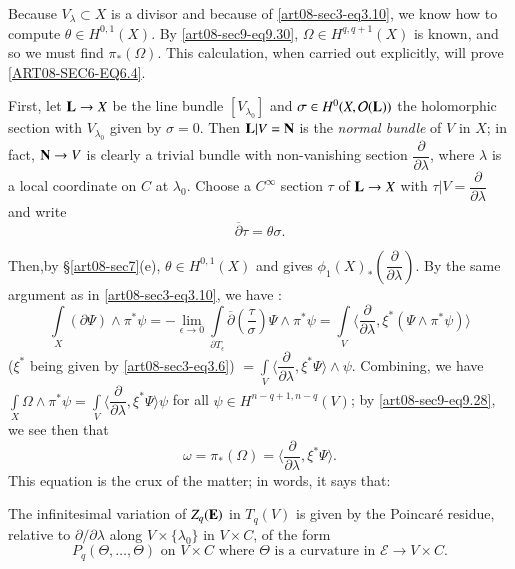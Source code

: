 Because $V_{\lambda}\subset X$ is a divisor and because of \eqref{art08-sec3-eq3.10}, we know how to compute $\theta\in H^{0,1}(X)$. By \eqref{art08-sec9-eq9.30}, $\Omega\in H^{q,q+1}(X)$ is known, and so we must find $\pi_{*}(\Omega)$. This calculation, when carried out explicitly, will prove \eqref{ART08-SEC6-EQ6.4}.

First, let $\mathbf{L}\to X$ be the line bundle $[V_{\lambda_{0}}]$ and $\sigma\in H^{0}(X,\mathcal{O}(\mathbf{L}))$ the holomorphic section with $V_{\lambda_{0}}$ given by $\sigma=0$. Then $\mathbf{L}|V=\mathbf{N}$ is the {\em normal bundle} of $V$ in $X$; in fact, $\mathbf{N}\to V$ is clearly a trivial bundle with non-vanishing section $\dfrac{\partial}{\partial\lambda}$, where $\lambda$ is a local coordinate on $C$ at $\lambda_{0}$. Choose a $C^{\infty}$ section $\tau$ of $\mathbf{L}\to X$ with $\tau|V=\dfrac{\partial}{\partial\lambda}$ and write
\begin{equation}
\overline{\partial}\tau = \theta\sigma.\label{art08-sec9-eq9.31}
\end{equation}

Then,\pageoriginale by \S\ref{art08-sec7}(e), $\theta\in H^{0,1}(X)$ and gives $\phi_{1}(X)_{*}\left(\dfrac{\partial}{\partial\lambda}\right)$. By the same argument as in \eqref{art08-sec3-eq3.10}, we have :
$$
\int\limits_{X}(\partial \Psi)\wedge \pi^{*}\psi=-\lim\limits_{\epsilon\to 0}\int\limits_{\partial T_{\epsilon}}\overline{\partial}\left(\dfrac{\tau}{\sigma}\right)\Psi \wedge \pi^{*}\psi=\int\limits_{V}\langle \dfrac{\partial}{\partial \lambda},\xi^{*}(\Psi\wedge\pi^{*}\psi)\rangle
$$
($\xi^{*}$ being given by \eqref{art08-sec3-eq3.6}) $=\int\limits_{V}\langle \dfrac{\partial}{\partial \lambda}, \xi^{*}\Psi\rangle \wedge\psi$. Combining, we have $\int\limits_{X}\Omega \wedge \pi^{*}\psi=\int\limits_{V}\langle \dfrac{\partial}{\partial\lambda},\xi^{*}\Psi\rangle \psi$ for all $\psi\in H^{n-q+1,n-q}(V)$; by \eqref{art08-sec9-eq9.28}, we see then that
\begin{equation}
\omega=\pi_{*}(\Omega)=\langle \dfrac{\partial}{\partial\lambda},\xi^{*}\Psi\rangle.\label{art08-sec9-eq9.32}
\end{equation}
This equation is the crux of the matter; in words, it says that:

The infinitesimal variation of $Z_{q}(\mathbf{E})$ in $T_{q}(V)$ is given by the Poincar\'e residue, relative to $\partial/\partial\lambda$ along $V\times \{\lambda_{0}\}$ in $V\times C$, of the form 
\begin{equation}
P_{q}(\Theta,\ldots,\Theta)\text{ on } V\times C\text{ where } \Theta \text{ is a curvature in } \mathcal{E}\to V\times C.\label{art08-sec9-eq9.33}
\end{equation}


